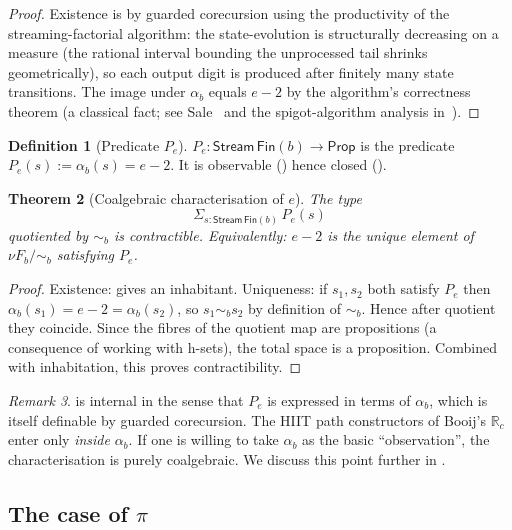 \documentclass[12pt]{article}
\newtheorem{theorem}{Theorem}[section]
\theoremstyle{definition}
\newtheorem{definition}[theorem]{Definition}
\theoremstyle{remark}
\newtheorem{remark}[theorem]{Remark}
\newcommand{\R}{\mathbb{R}}
\newcommand{\Rc}{\R_c}
\newcommand{\Stream}{\mathsf{Stream}}
\newcommand{\bisim}{\mathrel{\sim}}
\begin{document}
\begin{proof}
Existence is by guarded corecursion using the productivity of the
streaming-factorial algorithm: the state-evolution is structurally
decreasing on a measure (the rational interval bounding the
unprocessed tail shrinks geometrically), so each output digit is
produced after finitely many state transitions. The image under
$\alpha_b$ equals $e-2$ by the algorithm's correctness
theorem (a classical fact; see Sale~\cite{sale-e-1968} and the
spigot-algorithm analysis in~\cite{rabwagon-spigot,gibbons-spigot}).
\end{proof}

\begin{definition}[Predicate $P_e$]\label{def:Pe}
$P_e: \Stream\,\mathsf{Fin}(b) \to \mathsf{Prop}$ is the predicate
$P_e(s) := \alpha_b(s) = e - 2$. It is observable
() hence closed ().
\end{definition}

\begin{theorem}[Coalgebraic characterisation of $e$]\label{thm:e-char}
The type
\[
\Sigma_{s : \Stream\,\mathsf{Fin}(b)}\,P_e(s)
\]
quotiented by $\bisim_b$ is contractible. Equivalently:
$e - 2$ is the unique element of $\nu F_b/{\bisim_b}$ satisfying $P_e$.
\end{theorem}

\begin{proof}
Existence:  gives an inhabitant.
Uniqueness: if $s_1, s_2$ both satisfy $P_e$ then
$\alpha_b(s_1) = e - 2 = \alpha_b(s_2)$, so $s_1 \bisim_b s_2$
by definition of $\bisim_b$. Hence after quotient they coincide.
Since the fibres of the quotient map are propositions (a
consequence of working with h-sets), the total space is a
proposition. Combined with inhabitation, this proves
contractibility.
\end{proof}

\begin{remark}
 is internal in the sense that
$P_e$ is expressed in terms of $\alpha_b$, which is itself
definable by guarded corecursion. The HIIT path constructors of
Booij's $\Rc$ enter only \emph{inside} $\alpha_b$. If one is
willing to take $\alpha_b$ as the basic ``observation'', the
characterisation is purely coalgebraic. We discuss this point
further in .
\end{remark}

\subsection{\texorpdfstring{The case of $\pi$}{The case of pi}}
\end{document}
